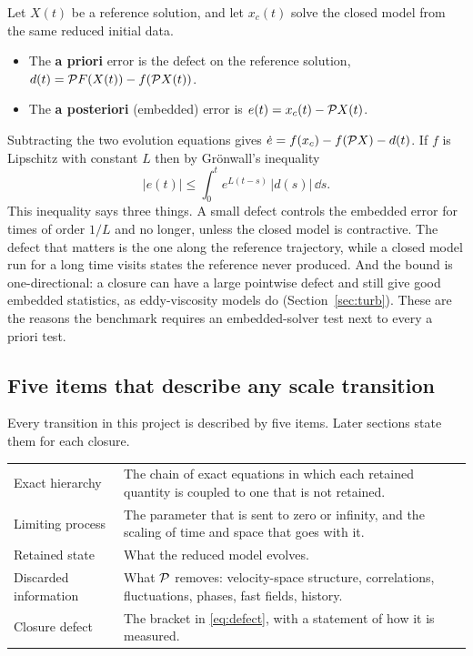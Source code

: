Let $X(t)$ be a reference solution, and let $x_c(t)$ solve the closed model
from the same reduced initial data.
\begin{itemize}
  \item The \textbf{a priori} error is the defect on the reference solution,
    $d(t) = \mathcal{P} F(X(t)) - f(\mathcal{P} X(t))$.
  \item The \textbf{a posteriori} (embedded) error is
    $e(t) = x_c(t) - \mathcal{P} X(t)$.
\end{itemize}
Subtracting the two evolution equations gives
$\dot e = f(x_c) - f(\mathcal{P} X) - d(t)$. If $f$ is Lipschitz with constant $L$
then by Gr\"onwall's inequality
\begin{equation}
  |e(t)| \le \int_0^t e^{L(t-s)}\,|d(s)|\,\dd s .
  \label{eq:gronwall}
\end{equation}
This inequality says three things. A small defect controls the embedded
error for times of order $1/L$ and no longer, unless the closed model is
contractive. The defect that matters is the one along the reference
trajectory, while a closed model run for a long time visits states the
reference never produced. And the bound is one-directional: a closure can
have a large pointwise defect and still give good embedded statistics, as
eddy-viscosity models do (Section~\ref{sec:turb}). These are the reasons the
benchmark requires an embedded-solver test next to every a priori test.

\subsection{Five items that describe any scale transition}

Every transition in this project is described by five items. Later sections
state them for each closure.
\begin{center}
\renewcommand{\arraystretch}{1.25}
\begin{tabularx}{\textwidth}{@{}P{3.4cm}Y@{}}
\toprule
Exact hierarchy & The chain of exact equations in which each retained
  quantity is coupled to one that is not retained. \\
Limiting process & The parameter that is sent to zero or infinity, and the
  scaling of time and space that goes with it. \\
Retained state & What the reduced model evolves. \\
Discarded information & What $\mathcal{P}$ removes: velocity-space structure,
  correlations, fluctuations, phases, fast fields, history. \\
Closure defect & The bracket in \eqref{eq:defect}, with a statement of how
  it is measured. \\
\bottomrule
\end{tabularx}
\end{center}

